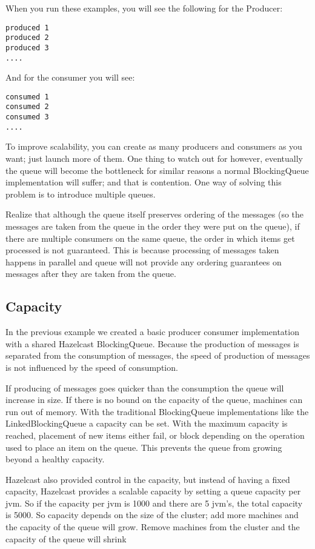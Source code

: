 When you run these examples, you will see the following for the Producer:
\begin{verbatim}
produced 1
produced 2
produced 3
....
\end{verbatim}

And for the consumer you will see:
\begin{verbatim}
consumed 1
consumed 2
consumed 3
....
\end{verbatim}

To improve scalability, you can create as many producers and consumers as you want; just launch 
more of them. One thing to watch out for however, eventually the queue will become the bottleneck 
for similar reasons a normal BlockingQueue implementation will suffer; and that is contention. One 
way of solving this problem is to introduce multiple queues.

Realize that although the queue itself preserves ordering of the messages (so the messages
are taken from the queue in the order they were put on the queue), if there are multiple consumers 
on the same queue, the order in which items get processed is not guaranteed. This is because processing
of messages taken happens in parallel and queue will not provide any ordering guarantees on messages
after they are taken from the queue.

\subsection{Capacity}

In the previous example we created a basic producer consumer implementation with a shared
Hazelcast BlockingQueue. Because the production of messages is separated from the consumption
of messages, the speed of production of messages is not influenced by the speed of consumption.

If producing of messages goes quicker than the consumption the queue will increase in size. If 
there is no bound on the capacity of the queue, machines can run out of memory. With the traditional 
BlockingQueue implementations like the LinkedBlockingQueue a capacity can be set. With the maximum 
capacity is reached, placement of new items either fail, or block depending on the operation used
to place an item on the queue. This prevents the queue from growing beyond a healthy capacity.

Hazelcast also provided control in the capacity, but instead of having a fixed capacity, Hazelcast
provides a scalable capacity by setting a queue capacity per jvm. So if the capacity per jvm is 1000
and there are 5 jvm's, the total capacity is 5000. So capacity depends on the size of the cluster; 
add more machines and the capacity of the queue will grow. Remove machines from the cluster and 
the capacity of the queue will shrink 

